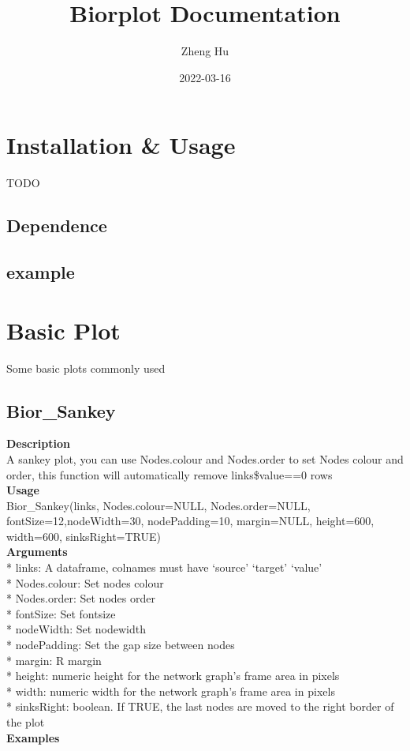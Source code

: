 \documentclass[
]{book}
\title{Biorplot Documentation}
\author{Zheng Hu}
\date{2022-03-16}
\begin{document}
\maketitle

{
\setcounter{tocdepth}{1}
\tableofcontents
}
\hypertarget{installation-usage}{%
\chapter{Installation \& Usage}\label{installation-usage}}

TODO

\hypertarget{dependence}{%
\section{Dependence}\label{dependence}}

\hypertarget{example}{%
\section{example}\label{example}}

\hypertarget{basic-plot}{%
\chapter{Basic Plot}\label{basic-plot}}

Some basic plots commonly used

\hypertarget{bior_sankey}{%
\section{Bior\_Sankey}\label{bior_sankey}}

\textbf{Description}\\
A sankey plot, you can use Nodes.colour and Nodes.order to set Nodes colour and
order, this function will automatically remove links\$value==0 rows\\
\textbf{Usage}\\
Bior\_Sankey(links, Nodes.colour=NULL, Nodes.order=NULL, fontSize=12,nodeWidth=30,
nodePadding=10, margin=NULL, height=600, width=600, sinksRight=TRUE)\\
\textbf{Arguments}\\
* links: A dataframe, colnames must have `source' `target' `value'\\
* Nodes.colour: Set nodes colour\\
* Nodes.order: Set nodes order\\
* fontSize: Set fontsize\\
* nodeWidth: Set nodewidth\\
* nodePadding: Set the gap size between nodes\\
* margin: R margin\\
* height: numeric height for the network graph's frame area in pixels\\
* width: numeric width for the network graph's frame area in pixels\\
* sinksRight: boolean. If TRUE, the last nodes are moved to the right border of the plot\\
\textbf{Examples}\\
\end{document}

